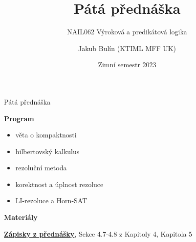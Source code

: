 \documentclass{beamer}
\title{Pátá přednáška}
\subtitle{NAIL062 Výroková a predikátová logika}
\author{Jakub Bulín (KTIML MFF UK)}
\date{Zimní semestr 2023}
\begin{document}
\frame{\titlepage}


\begin{frame}{Pátá přednáška}

    \textbf{Program}
        \begin{itemize}
            \item věta o kompaktnosti
            \item hilbertovský kalkulus
            \item rezoluční metoda
            \item korektnost a úplnost rezoluce
            \item LI-rezoluce a Horn-SAT
        \end{itemize}

    \textbf{Materiály}

        \href{https://github.com/jbulin-mff-uk/nail062/raw/main/lecture/lecture-notes/lecture-notes.pdf}{\alert{\textbf{Zápisky z přednášky}}}, Sekce 4.7-4.8 z Kapitoly 4, Kapitola 5

\end{frame}
\end{document}
